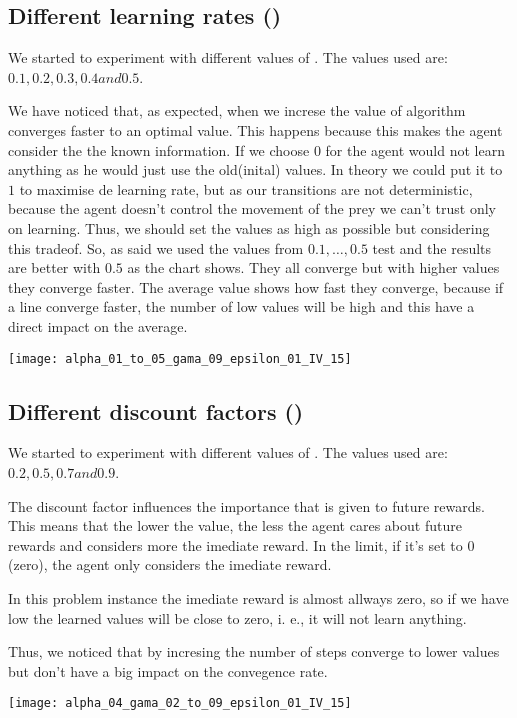 \documentclass{article}
\begin{document}
\subsection{Different learning rates (\alpha)}
We started to experiment with different values of \alpha. The values used are:
$0.1 , 0.2, 0.3, 0.4 and 0.5$. 

We have noticed that, as expected, when we increse the value of \alpha algorithm
converges faster to an optimal value. This happens because this makes the agent
consider the the known information. If we choose $0$ for \alpha the agent would
not learn anything as he would just use the old(inital) values.
In theory we could put it to $1$ to maximise de learning rate, but as our
transitions are not deterministic, because the agent doesn't control the
movement of the prey we can't trust only on learning.
Thus, we should set the values as high as possible but considering this tradeof.
So, as said we used the values from $0.1, \ldots , 0.5$ test and the results are
better with $0.5$ as the chart shows. They all converge but with higher values
they converge faster. The average value shows how fast they converge, because if
a line converge faster, the number of low values will be high and this have a
direct impact on the average.

\texttt{[image: alpha\_01\_to\_05\_gama\_09\_epsilon\_01\_IV\_15]}

\subsection{Different discount factors (\gamma)}
We started to experiment with different values of \gamma. The values used are:
$0.2, 0.5, 0.7 and 0.9$. 

The discount factor influences the importance that is given to future rewards.
This means that the lower the value, the less the agent cares about future
rewards and considers more the imediate reward. In the limit, if it's set to
$0$ (zero), the agent only considers the imediate reward.

In this problem instance the imediate reward is almost allways zero, so if we
have low \gamma the learned values will be close to zero, i. e., it will not
learn anything. 

Thus, we noticed that by incresing \gamma the number of steps converge to lower
values but don't have a big impact on the convegence rate.

\texttt{[image: alpha\_04\_gama\_02\_to\_09\_epsilon\_01\_IV\_15]}
\end{document}

